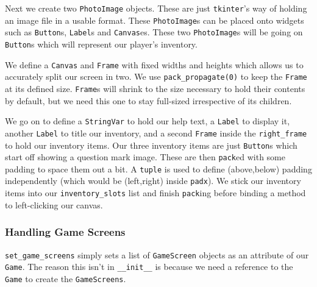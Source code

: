 \documentclass[a4paper,11pt,openany]{book}
\begin{document}
\vspace{5mm}

Next we create two \lstinline[columns=fixed]{PhotoImage} objects. These are just \lstinline[columns=fixed]{tkinter}'s way of holding an image file in a usable format. These \lstinline[columns=fixed]{PhotoImage}s can be placed onto widgets such as \lstinline[columns=fixed]{Button}s, \lstinline[columns=fixed]{Label}s and \lstinline[columns=fixed]{Canvas}es. These two \lstinline[columns=fixed]{PhotoImage}s will be going on \lstinline[columns=fixed]{Button}s which will represent our player's inventory. 

\vspace{5mm}      

We define a \lstinline[columns=fixed]{Canvas} and \lstinline[columns=fixed]{Frame} with fixed widths and heights which allows us to accurately split our screen in two. We use \lstinline[columns=fixed]{pack_propagate(0)} to keep the \lstinline[columns=fixed]{Frame} at its defined size. \lstinline[columns=fixed]{Frame}s will shrink to the size necessary to hold their contents by default, but we need this one to stay full-sized irrespective of its children.

\vspace{5mm}

We go on to define a \lstinline[columns=fixed]{StringVar} to hold our help text, a \lstinline[columns=fixed]{Label} to display it, another \lstinline[columns=fixed]{Label} to title our inventory, and a second \lstinline[columns=fixed]{Frame} inside the \lstinline[columns=fixed]{right_frame} to hold our inventory items. Our three inventory items are just \lstinline[columns=fixed]{Button}s which start off showing a question mark image. These are then \lstinline[columns=fixed]{pack}ed with some padding to space them out a bit. A \lstinline[columns=fixed]{tuple} is used to define (above,below) padding independently (which would be (left,right) inside \lstinline[columns=fixed]{padx}). We stick our inventory items into our \lstinline[columns=fixed]{inventory_slots} list and finish \lstinline[columns=fixed]{pack}ing before binding a method to left-clicking our canvas.

\subsubsection{Handling Game Screens}

\lstinline[columns=fixed]{set_game_screens} simply sets a list of \lstinline[columns=fixed]{GameScreen} objects as an attribute of our \lstinline[columns=fixed]{Game}. The reason this isn't in \lstinline[columns=fixed]{__init__} is because we need a reference to the \lstinline[columns=fixed]{Game} to create the \lstinline[columns=fixed]{GameScreens}. 
\end{document}
